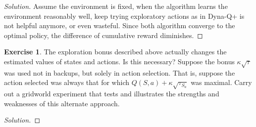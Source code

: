 \documentclass[oneside,11pt]{article}
\theoremstyle{definition}
\newtheorem{exer}[thm]{Exercise}
\newenvironment{solution}
{\renewcommand\qedsymbol{$\blacksquare$}\begin{proof}[Solution]} {\end{proof}}
\begin{document}
\begin{shaded}
\begin{solution} 
Assume the environment is fixed, when the algorithm learns the environment reasonably well, keep trying exploratory actions as in Dyna-Q+ is not helpful anymore, or even wasteful. Since both algorithm converge to the optimal policy, the difference of cumulative reward diminishes.
\end{solution} 
\end{shaded}


\begin{exer}

The exploration bonus described above actually changes the estimated values of states and actions. Is this necessary? Suppose the bonus $\kappa \sqrt{\tau}$ was used not in backups, but solely in action selection. That is, suppose the action selected was always that for which $Q(S, a) +\kappa \sqrt{\tau_{S_a}}$ was maximal. Carry out a gridworld experiment that tests and illustrates the strengths and weaknesses of this alternate approach.
\end{exer}


\begin{shaded}
\begin{solution} 


\end{solution} 
\end{shaded}






  
\end{document}
